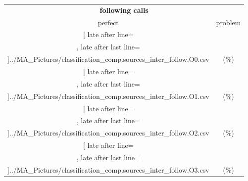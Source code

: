 \begin{table}[!htbp]
{\begin{tabular}{l|c|c|c}
    	\end{tabular}

	\begin{tabular}{|c|c}%

	\toprule
    \multicolumn{2}{c}{\bfseries following calls}\\
	
	     perfect &  problem %
	\\\midrule
	\csvreader[ late after line=\\, late after last line=\\\midrule]{../MA_Pictures/classification_comp.sources_inter_follow.O0.csv}{
}
	{\csvcoliv (\csvcolv \%) & \csvcolvi (\csvcolvii\%)}%
\multicolumn{1}{c}{}

	\\\midrule
	\csvreader[ late after line=\\, late after last line=\\\midrule]{../MA_Pictures/classification_comp.sources_inter_follow.O1.csv}{
}
	{\csvcoliv (\csvcolv \%) & \csvcolvi (\csvcolvii\%)}%
	
	\multicolumn{1}{c}{}

	\\\midrule
	\csvreader[ late after line=\\, late after last line=\\\midrule]{../MA_Pictures/classification_comp.sources_inter_follow.O2.csv}{
}
	{\csvcoliv (\csvcolv \%) & \csvcolvi (\csvcolvii\%)}%
	
\multicolumn{1}{c}{}
	\\\midrule
	\csvreader[ late after line=\\, late after last line=\\\bottomrule]{../MA_Pictures/classification_comp.sources_inter_follow.O3.csv}{
}
	{\csvcoliv (\csvcolv \%) & \csvcolvi (\csvcolvii\%)}%



\end{tabular}}
\end{table}

